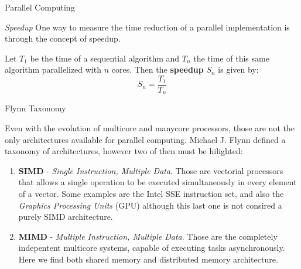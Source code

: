 \begin{section}{Parallel Computing}
\begin{subsection}{\textit{Speedup}}
	One way to measure the time reduction of a parallel implementation
	is through the concept of speedup. 

\begin{definition}
	Let $T_1$ be the time of a sequential algorithm and $T_n$ the time
	of this same algorithm parallelized with $n$ cores. Then the
	\textbf{speedup} $S_n$ is given by:
    $$ S_n = \frac{T_1}{T_n} $$
\end{definition}


\end{subsection}


\begin{subsection}{Flynn Taxonomy}


Even with the evolution of multicore and manycore processors,
those are not the only architectures available for parallel computing.
Michael J. Flynn \citep{pacheco:2011} defined a taxonomy of architectures,
however two of then must be hilighted:
\begin{enumerate}
    \item \textbf{SIMD} - \textit{Single Instruction, Multiple Data}. Those
	are vectorial processors that allows a single operation to be executed
	simultaneously in every element of a vector. Some examples are the
	Intel SSE instruction set, and also the \textit{Graphics Processing Units} (GPU)
	although this last one is not consired a purely SIMD architecture.

    \item \textbf{MIMD} - \textit{Multiple Instruction, Multiple Data}. Those
	are the completely indepentent multicore systems, capable of
	executing tasks asynchronously. Here we find both shared memory and distributed
	memory architecture.

\end{enumerate}
\end{subsection}


\end{section}
